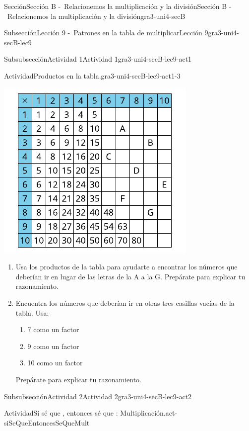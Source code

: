 \documentclass[twoside,10pt,]{article}
\begin{document}
\begin{sectionptx}{Sección}{Sección B -~Relacionemos la multiplicación y la división}{}{Sección B -~Relacionemos la multiplicación y la división}{}{}{gra3-uni4-secB}
\begin{subsectionptx}{Subsección}{Lección 9 -~Patrones en la tabla de multiplicar}{}{Lección 9}{}{}{gra3-uni4-secB-lec9}
\begin{subsubsectionptx}{Subsubsección}{Actividad 1}{}{Actividad 1}{}{}{gra3-uni4-secB-lec9-act1}
\begin{activity}{Actividad}{Productos en la tabla.}{gra3-uni4-secB-lec9-act1-3}
\begin{image}{0}{1}{0}{}
\includegraphics[width=\linewidth]{external/svg-source/tikz-file-152978.pdf}
\end{image}%
%
\begin{enumerate}
\item{}Usa los productos de la tabla para ayudarte a encontrar los números que deberían ir en lugar de las letras de la A a la G. Prepárate para explicar tu razonamiento.%
\item{}Encuentra los números que deberían ir en otras tres casillas vacías de la tabla. Usa:%
%
\begin{enumerate}
\item{}7 como un factor%
\item{}9 como un factor%
\item{}10 como un factor%
\end{enumerate}
Prepárate para explicar tu razonamiento.%
\end{enumerate}
\end{activity}%
\end{subsubsectionptx}
%
%
\typeout{************************************************}
\typeout{************************************************}
%
\begin{subsubsectionptx}{Subsubsección}{Actividad 2}{}{Actividad 2}{}{}{gra3-uni4-secB-lec9-act2}
\begin{activity}{Actividad}{Si sé que \textellipsis{}, entonces sé que \textellipsis{}: Multiplicación.}{act-siSeQueEntoncesSeQueMult}%

\end{activity}
\end{subsubsectionptx}
\end{subsectionptx}
\end{sectionptx}
\end{document}
